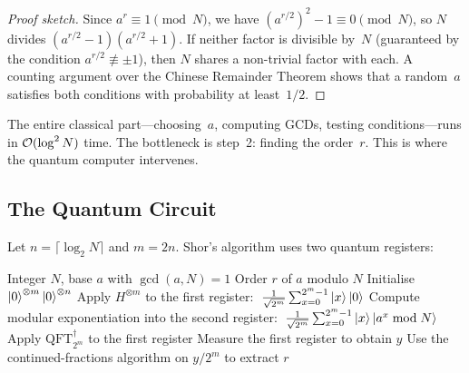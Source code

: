 \begin{proof}[Proof sketch]
Since $a^r \equiv 1 \pmod{N}$, we have $(a^{r/2})^2 - 1 \equiv 0 \pmod{N}$, so $N$ divides $(a^{r/2} - 1)(a^{r/2} + 1)$.  If neither factor is divisible by~$N$ (guaranteed by the condition $a^{r/2} \not\equiv \pm 1$), then $N$ shares a non-trivial factor with each.  A counting argument over the Chinese Remainder Theorem shows that a random~$a$ satisfies both conditions with probability at least~$1/2$.
\end{proof}

The entire classical part---choosing~$a$, computing GCDs, testing conditions---runs in $\mathcal{O}(\log^2 N)$ time.  The bottleneck is step~2: finding the order~$r$.  This is where the quantum computer intervenes.


\subsection{The Quantum Circuit}
\label{subsec:shor-circuit}

Let $n = \lceil \log_2 N \rceil$ and $m = 2n$.  Shor's algorithm uses two quantum registers:

\begin{algorithm}[t]
\caption{Quantum Order Finding (core of Shor's algorithm)}
\label{alg:shor}
\begin{algorithmic}[1]
\Require Integer $N$, base $a$ with $\gcd(a,N)=1$
\Ensure Order $r$ of $a$ modulo $N$
\State Initialise $\ket{0}^{\otimes m}\ket{0}^{\otimes n}$
\State Apply $H^{\otimes m}$ to the first register:
  $\;\frac{1}{\sqrt{2^m}}\sum_{x=0}^{2^m - 1}\ket{x}\ket{0}$
\State Compute modular exponentiation into the second register:
  $\;\frac{1}{\sqrt{2^m}}\sum_{x=0}^{2^m - 1}\ket{x}\ket{a^x \bmod N}$
\State Apply $\text{QFT}_{2^m}^{\dagger}$ to the first register
\State Measure the first register to obtain $y$
\State Use the continued-fractions algorithm on $y/2^m$ to extract $r$
\end{algorithmic}
\end{algorithm}

